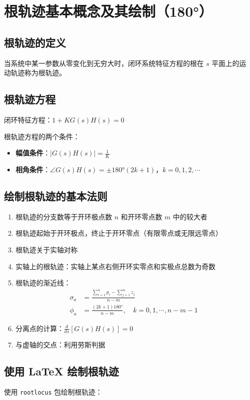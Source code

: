\section{根轨迹基本概念及其绘制（180°）}

\subsection{根轨迹的定义}
当系统中某一参数从零变化到无穷大时，闭环系统特征方程的根在 $s$ 平面上的运动轨迹称为根轨迹。

\subsection{根轨迹方程}
闭环特征方程：$1 + KG(s)H(s) = 0$

根轨迹方程的两个条件：
\begin{itemize}
    \item \textbf{幅值条件}：$|G(s)H(s)| = \frac{1}{K}$
    \item \textbf{相角条件}：$\angle G(s)H(s) = \pm 180°(2k+1)$，$k = 0, 1, 2, \cdots$
\end{itemize}

\subsection{绘制根轨迹的基本法则}
\begin{enumerate}
    \item 根轨迹的分支数等于开环极点数 $n$ 和开环零点数 $m$ 中的较大者
    \item 根轨迹起始于开环极点，终止于开环零点（有限零点或无限远零点）
    \item 根轨迹关于实轴对称
    \item 实轴上的根轨迹：实轴上某点右侧开环实零点和实极点总数为奇数
    \item 根轨迹的渐近线：
    \begin{align}
    \sigma_a &= \frac{\sum_{i=1}^n p_i - \sum_{j=1}^m z_j}{n-m} \\
    \phi_a &= \frac{(2k+1)180°}{n-m}, \quad k = 0, 1, \cdots, n-m-1
    \end{align}
    \item 分离点的计算：$\frac{d}{ds}[G(s)H(s)] = 0$
    \item 与虚轴的交点：利用劳斯判据
\end{enumerate}

\subsection{使用 LaTeX 绘制根轨迹}
使用 \texttt{rootlocus} 包绘制根轨迹：

